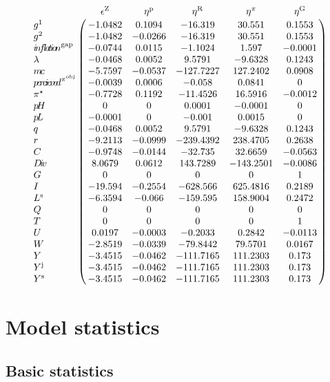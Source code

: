 $$\bordermatrix{
~ & \epsilon^{\mathrm{Z}} & \eta^{\mathrm{p}} & \eta^{\mathrm{R}} & \eta^{\pi} & \eta^{\mathrm{G}} \cr
g^{\mathrm{1}} & -1.0482 & 0.1094 & -16.319 & 30.551 & 0.1553 \cr
g^{\mathrm{2}} & -1.0482 & -0.0266 & -16.319 & 30.551 & 0.1553 \cr
{i\!n\!f\!l\!a\!t\!i\!o\!n}^{\mathrm{gap}} & -0.0744 & 0.0115 & -1.1024 & 1.597 & -0.0001 \cr
\lambda & -0.0468 & 0.0052 & 9.5791 & -9.6328 & 0.1243 \cr
{m\!c} & -5.7597 & -0.0537 & -127.7227 & 127.2402 & 0.0908 \cr
{p\!e\!r\!c\!i\!e\!v\!e\!d}^{\pi^{\mathrm{obj}}} & -0.0039 & 0.0006 & -0.058 & 0.0841 & 0 \cr
\pi^{\star} & -0.7728 & 0.1192 & -11.4526 & 16.5916 & -0.0012 \cr
{p\!H} & 0 & 0 & 0.0001 & -0.0001 & 0 \cr
{p\!L} & -0.0001 & 0 & -0.001 & 0.0015 & 0 \cr
q & -0.0468 & 0.0052 & 9.5791 & -9.6328 & 0.1243 \cr
r & -9.2113 & -0.0999 & -239.4392 & 238.4705 & 0.2638 \cr
C & -0.9748 & -0.0144 & -32.735 & 32.6659 & -0.0563 \cr
{D\!i\!v} & 8.0679 & 0.0612 & 143.7289 & -143.2501 & -0.0086 \cr
G & 0 & 0 & 0 & 0 & 1 \cr
I & -19.594 & -0.2554 & -628.566 & 625.4816 & 0.2189 \cr
L^{\mathrm{s}} & -6.3594 & -0.066 & -159.595 & 158.9004 & 0.2472 \cr
Q & 0 & 0 & 0 & 0 & 0 \cr
T & 0 & 0 & 0 & 0 & 1 \cr
U & 0.0197 & -0.0003 & -0.2033 & 0.2842 & -0.0113 \cr
W & -2.8519 & -0.0339 & -79.8442 & 79.5701 & 0.0167 \cr
Y & -3.4515 & -0.0462 & -111.7165 & 111.2303 & 0.173 \cr
Y^{\mathrm{j}} & -3.4515 & -0.0462 & -111.7165 & 111.2303 & 0.173 \cr
Y^{\mathrm{s}} & -3.4515 & -0.0462 & -111.7165 & 111.2303 & 0.173 \cr
}$$


\section{Model statistics}

\subsection{Basic statistics}

